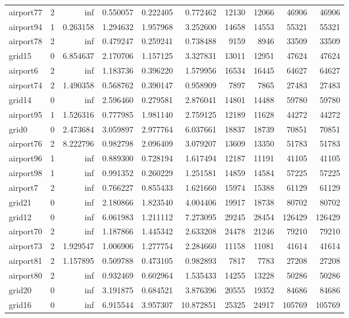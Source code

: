 \begin{longtable}{|l|r|r|r|r|r|r|r|r|r|}
airport77 & 2 & inf & 0.550057 & 0.222405 & 0.772462 & 12130 & 12066 & 46906 & 46906 \\
airport94 & 1 & 0.263158 & 1.294632 & 1.957968 & 3.252600 & 14658 & 14553 & 55321 & 55321 \\
airport78 & 2 & inf & 0.479247 & 0.259241 & 0.738488 & 9159 & 8946 & 33509 & 33509 \\
grid15 & 0 & 6.854637 & 2.170706 & 1.157125 & 3.327831 & 13011 & 12951 & 47624 & 47624 \\
airport6 & 2 & inf & 1.183736 & 0.396220 & 1.579956 & 16534 & 16445 & 64627 & 64627 \\
airport74 & 2 & 1.490358 & 0.568762 & 0.390147 & 0.958909 & 7897 & 7865 & 27483 & 27483 \\
grid14 & 0 & inf & 2.596460 & 0.279581 & 2.876041 & 14801 & 14488 & 59780 & 59780 \\
airport95 & 1 & 1.526316 & 0.777985 & 1.981140 & 2.759125 & 12189 & 11628 & 44272 & 44272 \\
grid0 & 0 & 2.473684 & 3.059897 & 2.977764 & 6.037661 & 18837 & 18739 & 70851 & 70851 \\
airport76 & 2 & 8.222796 & 0.982798 & 2.096409 & 3.079207 & 13609 & 13350 & 51783 & 51783 \\
airport96 & 1 & inf & 0.889300 & 0.728194 & 1.617494 & 12187 & 11191 & 41105 & 41105 \\
airport98 & 1 & inf & 0.991352 & 0.260229 & 1.251581 & 14859 & 14584 & 57225 & 57225 \\
airport7 & 2 & inf & 0.766227 & 0.855433 & 1.621660 & 15974 & 15388 & 61129 & 61129 \\
grid21 & 0 & inf & 2.180866 & 1.823540 & 4.004406 & 19917 & 18738 & 80702 & 80702 \\
grid12 & 0 & inf & 6.061983 & 1.211112 & 7.273095 & 29245 & 28454 & 126429 & 126429 \\
airport70 & 2 & inf & 1.187866 & 1.445342 & 2.633208 & 24478 & 21246 & 79210 & 79210 \\
airport73 & 2 & 1.929547 & 1.006906 & 1.277754 & 2.284660 & 11158 & 11081 & 41614 & 41614 \\
airport81 & 2 & 1.157895 & 0.509788 & 0.473105 & 0.982893 & 7817 & 7783 & 27208 & 27208 \\
airport80 & 2 & inf & 0.932469 & 0.602964 & 1.535433 & 14255 & 13228 & 50286 & 50286 \\
grid20 & 0 & inf & 3.191875 & 0.684521 & 3.876396 & 20555 & 19352 & 84686 & 84686 \\
grid16 & 0 & inf & 6.915544 & 3.957307 & 10.872851 & 25325 & 24917 & 105769 & 105769 \\

\end{longtable}
